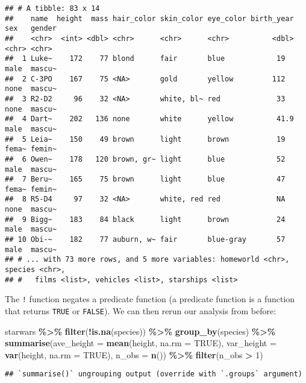 \documentclass[
]{article}
\newenvironment{Shaded}{\begin{snugshade}}{\end{snugshade}}
\newcommand{\DataTypeTok}[1]{\textcolor[rgb]{0.13,0.29,0.53}{#1}}
\newcommand{\DecValTok}[1]{\textcolor[rgb]{0.00,0.00,0.81}{#1}}
\newcommand{\KeywordTok}[1]{\textcolor[rgb]{0.13,0.29,0.53}{\textbf{#1}}}
\newcommand{\NormalTok}[1]{#1}
\newcommand{\OperatorTok}[1]{\textcolor[rgb]{0.81,0.36,0.00}{\textbf{#1}}}
\newcommand{\OtherTok}[1]{\textcolor[rgb]{0.56,0.35,0.01}{#1}}
\newcommand{\StringTok}[1]{\textcolor[rgb]{0.31,0.60,0.02}{#1}}
\begin{document}
\begin{verbatim}
## # A tibble: 83 x 14
##    name  height  mass hair_color skin_color eye_color birth_year sex   gender
##    <chr>  <int> <dbl> <chr>      <chr>      <chr>          <dbl> <chr> <chr> 
##  1 Luke~    172    77 blond      fair       blue            19   male  mascu~
##  2 C-3PO    167    75 <NA>       gold       yellow         112   none  mascu~
##  3 R2-D2     96    32 <NA>       white, bl~ red             33   none  mascu~
##  4 Dart~    202   136 none       white      yellow          41.9 male  mascu~
##  5 Leia~    150    49 brown      light      brown           19   fema~ femin~
##  6 Owen~    178   120 brown, gr~ light      blue            52   male  mascu~
##  7 Beru~    165    75 brown      light      blue            47   fema~ femin~
##  8 R5-D4     97    32 <NA>       white, red red             NA   none  mascu~
##  9 Bigg~    183    84 black      light      brown           24   male  mascu~
## 10 Obi-~    182    77 auburn, w~ fair       blue-gray       57   male  mascu~
## # ... with 73 more rows, and 5 more variables: homeworld <chr>, species <chr>,
## #   films <list>, vehicles <list>, starships <list>
\end{verbatim}

The \texttt{!} function negates a predicate function (a predicate function is a function that returns
\texttt{TRUE} or \texttt{FALSE}). We can then rerun our analysis from before:

\begin{Shaded}
\begin{Highlighting}[]
\NormalTok{starwars }\OperatorTok{\%\textgreater{}\%}
\StringTok{  }\KeywordTok{filter}\NormalTok{(}\OperatorTok{!}\KeywordTok{is.na}\NormalTok{(species)) }\OperatorTok{\%\textgreater{}\%}
\StringTok{  }\KeywordTok{group\_by}\NormalTok{(species) }\OperatorTok{\%\textgreater{}\%}
\StringTok{  }\KeywordTok{summarise}\NormalTok{(}\DataTypeTok{ave\_height =} \KeywordTok{mean}\NormalTok{(height, }\DataTypeTok{na.rm =} \OtherTok{TRUE}\NormalTok{), }\DataTypeTok{var\_height =} \KeywordTok{var}\NormalTok{(height, }\DataTypeTok{na.rm =} \OtherTok{TRUE}\NormalTok{), }\DataTypeTok{n\_obs =} \KeywordTok{n}\NormalTok{()) }\OperatorTok{\%\textgreater{}\%}
\StringTok{  }\KeywordTok{filter}\NormalTok{(n\_obs }\OperatorTok{\textgreater{}}\StringTok{ }\DecValTok{1}\NormalTok{)}
\end{Highlighting}
\end{Shaded}

\begin{verbatim}
## `summarise()` ungrouping output (override with `.groups` argument)
\end{verbatim}
\end{document}

